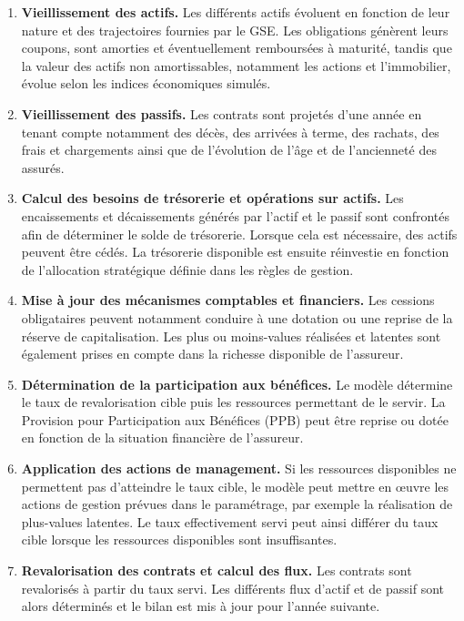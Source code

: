 \begin{enumerate}[noitemsep,topsep=2pt]
    \item \textbf{Vieillissement des actifs.} Les différents actifs évoluent en fonction de leur nature et des trajectoires fournies par le GSE. Les obligations génèrent leurs coupons, sont amorties et éventuellement remboursées à maturité, tandis que la valeur des actifs non amortissables, notamment les actions et l'immobilier, évolue selon les indices économiques simulés.

    \item \textbf{Vieillissement des passifs.} Les contrats sont projetés d'une année en tenant compte notamment des décès, des arrivées à terme, des rachats, des frais et chargements ainsi que de l'évolution de l'âge et de l'ancienneté des assurés.

    \item \textbf{Calcul des besoins de trésorerie et opérations sur actifs.} Les encaissements et décaissements générés par l'actif et le passif sont confrontés afin de déterminer le solde de trésorerie. Lorsque cela est nécessaire, des actifs peuvent être cédés. La trésorerie disponible est ensuite réinvestie en fonction de l'allocation stratégique définie dans les règles de gestion.

    \item \textbf{Mise à jour des mécanismes comptables et financiers.} Les cessions obligataires peuvent notamment conduire à une dotation ou une reprise de la réserve de capitalisation. Les plus ou moins-values réalisées et latentes sont également prises en compte dans la richesse disponible de l'assureur.

    \item \textbf{Détermination de la participation aux bénéfices.} Le modèle détermine le taux de revalorisation cible puis les ressources permettant de le servir. La Provision pour Participation aux Bénéfices (PPB) peut être reprise ou dotée en fonction de la situation financière de l'assureur.

    \item \textbf{Application des actions de management.} Si les ressources disponibles ne permettent pas d'atteindre le taux cible, le modèle peut mettre en œuvre les actions de gestion prévues dans le paramétrage, par exemple la réalisation de plus-values latentes. Le taux effectivement servi peut ainsi différer du taux cible lorsque les ressources disponibles sont insuffisantes.

    \item \textbf{Revalorisation des contrats et calcul des flux.} Les contrats sont revalorisés à partir du taux servi. Les différents flux d'actif et de passif sont alors déterminés et le bilan est mis à jour pour l'année suivante.
\end{enumerate}

